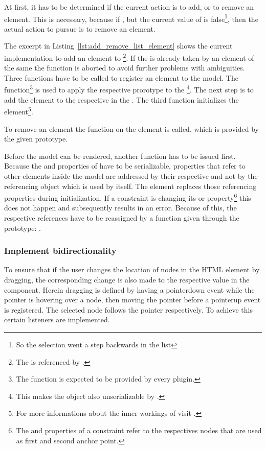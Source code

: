 At first, it has to be determined if the current action is to add, or to remove an element.
This is necessary, because if , but the current value of  is false\footnote{So the selection went a step backwards in the list}, then the actual action to pursue is to remove an element.

The excerpt in Listing~\ref{lst:add_remove_list_element} shows the current implementation to add an element to \footnote{The  is referenced by .}.
If the  is already taken by an element of the same  the function is aborted to avoid further problems with ambiguities.
Three functions have to be called to register an element to the  model.
The  function\footnote{The  function is expected to be provided by every  plugin.} is used to apply the respective prorotype to the \footnote{This makes the object also unserializable by .}.
The next step is to add the element to the respective  in the .
The third function initializes the element\footnote{For more informations about the inner workings of  visit .}.

To remove an element the  function on the element is called, which is provided by the given prototype.

Before the model can be rendered, another function has to be issued first.
Because the  and  properties of  have to be serializable, properties that refer to other elements inside the model are addressed by their respective  and not by the referencing object which is used by  itself.
The element replaces those referencing properties during initialization.
If a constraint is changing its  or  property\footnote{The  and  properties of a constraint refer to the respectives nodes that are used as first and second anchor point.} this does not happen and subsequently results in an error.
Because of this, the respective references have to be reassigned by a function given through the prototype: .

\subsubsection{Implement bidirectionality}

To ensure that if the user changes the location of nodes in the  HTML element by dragging, the corresponding change is also made to the respective value in the  component.
Herein dragging is defined by having a pointerdown event while the pointer is hovering over a node, then moving the pointer before a pointerup event is registered.
The selected node follows the pointer respectively.
To achieve this certain listeners are implemented.

